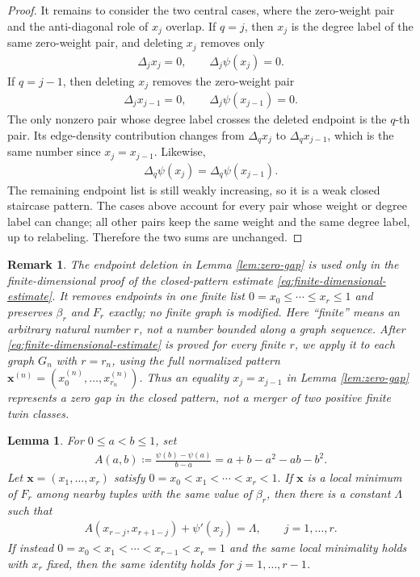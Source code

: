\documentclass[10pt,a4paper]{article}
\newtheorem{lemma}[definition]{Lemma}
\newtheorem{remark}[definition]{Remark}
\begin{document}
\begin{proof}
It remains to consider the two central cases, where the zero-weight pair and the anti-diagonal role of $x_j$ overlap.  If $q=j$, then $x_j$ is the degree label of the same zero-weight pair, and deleting $x_j$ removes only
\begin{align*}
  \Delta_jx_j=0,
  \qquad
  \Delta_j\psi(x_j)=0.
\end{align*}
If $q=j-1$, then deleting $x_j$ removes the zero-weight pair
\begin{align*}
  \Delta_jx_{j-1}=0,
  \qquad
  \Delta_j\psi(x_{j-1})=0.
\end{align*}
The only nonzero pair whose degree label crosses the deleted endpoint is the $q$-th pair.  Its edge-density contribution changes from $\Delta_qx_j$ to $\Delta_qx_{j-1}$, which is the same number since $x_j=x_{j-1}$.  Likewise,
\begin{align*}
  \Delta_q\psi(x_j)=\Delta_q\psi(x_{j-1}).
\end{align*}
The remaining endpoint list is still weakly increasing, so it is a weak closed staircase pattern.  The cases above account for every pair whose weight or degree label can change; all other pairs keep the same weight and the same degree label, up to relabeling.  Therefore the two sums are unchanged.
\end{proof}

\begin{remark}
The endpoint deletion in Lemma \ref{lem:zero-gap} is used only in the finite-dimensional proof of the closed-pattern estimate \eqref{eq:finite-dimensional-estimate}.  It removes endpoints in one finite list $0=x_0\le\cdots\le x_r\le1$ and preserves $\beta_r$ and $F_r$ exactly; no finite graph is modified.  Here ``finite'' means an arbitrary natural number $r$, not a number bounded along a graph sequence.  After \eqref{eq:finite-dimensional-estimate} is proved for every finite $r$, we apply it to each graph $G_n$ with $r=r_n$, using the full normalized pattern $\mathbf{x}^{(n)}=(x_0^{(n)},\ldots,x_{r_n}^{(n)})$.
Thus an equality $x_j=x_{j-1}$ in Lemma \ref{lem:zero-gap} represents a zero
gap in the closed pattern, not a merger of two positive finite twin classes.
\end{remark}

\begin{lemma}\label{lem:first-variation}
For $0\le a<b\le1$, set
\begin{align*}
  A(a,b)\coloneqq\frac{\psi(b)-\psi(a)}{b-a}=a+b-a^2-ab-b^2.
\end{align*}
Let $\mathbf{x}=(x_1,\ldots,x_r)$ satisfy
  $0=x_0<x_1<\cdots<x_r<1.$
If $\mathbf{x}$ is a local minimum of $F_r$ among nearby tuples with the same value of $\beta_r$, then there is a constant $\Lambda$ such that
\begin{align}\label{eq:first-var-balance}
  A(x_{r-j},x_{r+1-j})+\psi'(x_j)=\Lambda,
  \qquad j=1,\ldots,r.
\end{align}
If instead $0=x_0<x_1<\cdots<x_{r-1}<x_r=1$ and the same local minimality holds with $x_r$ fixed, then the same identity holds for $j=1,\ldots,r-1$.
\end{lemma}
\end{document}
